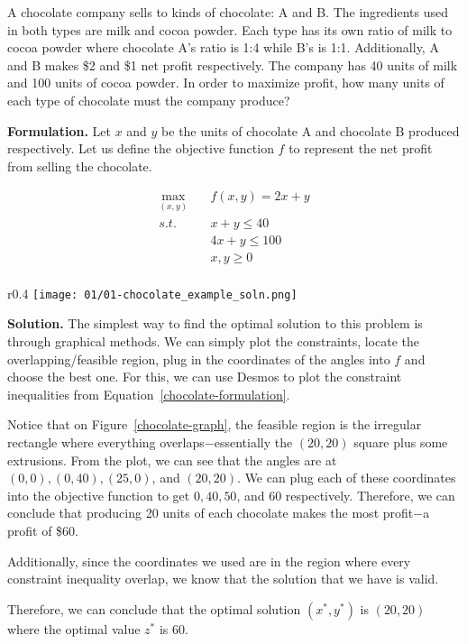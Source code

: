 \begin{example}
A chocolate company sells to kinds of chocolate: A and B. The 
ingredients used in both types are milk and cocoa powder. Each type 
has its own ratio of milk to cocoa powder where chocolate A's ratio 
is 1:4 while B's is 1:1. Additionally, A and B makes \$2 and \$1 
net profit respectively. The company has 40 units of milk and 100 units 
of cocoa powder. In order to maximize profit, how many units of each 
type of chocolate must the company produce?

\textbf{Formulation. } Let $x$ and $y$ be the units of chocolate A and chocolate B
produced respectively. Let us define the objective function $f$ to represent the 
net profit from selling the chocolate.

\begin{equation}\label{chocolate-formulation}
\begin{aligned}
    \max_{(x, y)} \quad &f(x, y) = 2x + y\\
    s.t. \quad & x + y \leq 40\\
    & 4x + y \leq 100\\
    & x, y \geq 0\\
\end{aligned}
\end{equation}

\begin{wrapfigure}{r}{0.4\textwidth}
	\centering
	\texttt{[image: 01/01-chocolate\_example\_soln.png]}
    \caption{Graph from Desmos}\label{chocolate-graph}
\end{wrapfigure}
\textbf{Solution. } The simplest way to find the optimal solution to this problem
is through graphical methods. We can simply plot the constraints, locate the
overlapping/feasible region, plug in the coordinates of the angles
into $f$ and choose the best one. For this, we can use Desmos to plot the constraint
inequalities from Equation~\ref{chocolate-formulation}.

Notice that on Figure~\ref{chocolate-graph}, the feasible region is the irregular
rectangle where everything overlaps$-$essentially the $(20, 20)$ square plus some 
extrusions. From the plot, we can see that the angles are at $(0, 0), (0, 40), (25, 0)$,
and $(20, 20)$. We can plug each of these coordinates into the objective function 
to get $0, 40, 50$, and $60$ respectively. Therefore, we can conclude that producing 
20 units of each chocolate makes the most profit$-$a profit of \$60.

Additionally, since the coordinates we used are in the region where every constraint 
inequality overlap, we know that the solution that we have is valid.

Therefore, we can conclude that the optimal solution $(x^*, y^*)$ is $(20, 20)$ where
the optimal value $z^*$ is $60$.
\end{example}

